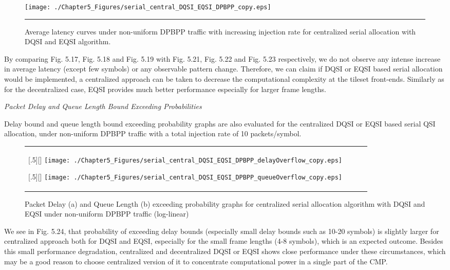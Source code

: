 \begin{figure}[htbp]
  \centering
    \texttt{[image: ./Chapter5\_Figures/serial\_central\_DQSI\_EQSI\_DPBPP\_copy.eps]}
    \rule{35em}{0.5pt}
  \caption[Centralized Serial DQSI and EQSI allocation average latency under non-uniform DPBPP]{Average latency curves under non-uniform DPBPP traffic with increasing injection rate for centralized serial allocation with DQSI and EQSI algorithm.}
  \label{fig:Electron} 
\end{figure} 


By comparing Fig. 5.17, Fig. 5.18 and Fig. 5.19 with Fig. 5.21, Fig. 5.22 and Fig. 5.23 respectively, we do not observe any intense increase in average latency (except few symbols) or any observable pattern change. Therefore, we can claim if DQSI or EQSI based serial allocation would be implemented, a centralized approach can be taken to decrease the computational complexity at the tileset front-ends. Similarly as for the decentralized case, EQSI provides much better performance especially for larger frame lengths. 

\pagebreak

\textit{Packet Delay and Queue Length Bound Exceeding Probabilities}


Delay bound and queue length bound exceeding probability graphs are also evaluated for the centralized DQSI or EQSI based serial QSI allocation, under non-uniform DPBPP traffic with a total injection rate of 10 packets/symbol.   


 \begin{figure*}[htbp]
  \centering
  \begin{tabular}[c]{cccc}

  \subcaptionbox{}[.5\linewidth][]{%
    \texttt{[image: ./Chapter5\_Figures/serial\_central\_DQSI\_EQSI\_DPBPP\_delayOverflow\_copy.eps]}}	
    
  \subcaptionbox{}[.5\linewidth][]{%
    \texttt{[image: ./Chapter5\_Figures/serial\_central\_DQSI\_EQSI\_DPBPP\_queueOverflow\_copy.eps]}}
 
   \end{tabular}

  \caption{Packet Delay (a) and Queue Length (b) exceeding probability graphs for centralized serial allocation algorithm with DQSI and EQSI under non-uniform DPBPP traffic (log-linear)}
\end{figure*}

We see in Fig. 5.24, that probability of exceeding delay bounds (especially small delay bounds such as 10-20 symbols) is slightly larger for centralized approach both for DQSI and EQSI, especially for the small frame lengths (4-8 symbols), which is an expected outcome. Besides this small performance degradation, centralized and decentralized DQSI or EQSI shows close performance under these circumstances, which may be a good reason to choose centralized version of it to concentrate computational power in a single part of the CMP.

